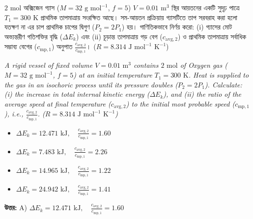 \documentclass[12pt, a4paper]{article}
\begin{document}
\begin{tcolorbox}[questionbox={প্রশ্ন (Question) 24}]
    \noindent
    $2\text{ mol}$ অক্সিজেন গ্যাস ($M = 32\text{ g mol}^{-1}$, $f = 5$) $V = 0.01\text{ m}^3$ স্থির আয়তনের একটি সুদৃঢ় পাত্রে $T_1 = 300\text{ K}$ প্রাথমিক তাপমাত্রায় সংরক্ষিত আছে। সম-আয়তন প্রক্রিয়ায় গ্যাসটিতে তাপ সরবরাহ করা হলো যতক্ষণ না এর চাপ প্রাথমিক চাপের দ্বিগুণ ($P_2 = 2P_1$) হয়। গাণিতিকভাবে নির্ণয় করো: (i) গ্যাসের মোট অভ্যন্তরীণ গতিশক্তির বৃদ্ধি ($\Delta E_k$) এবং (ii) চূড়ান্ত তাপমাত্রায় গড় বেগ ($c_{\text{avg},2}$) ও প্রাথমিক তাপমাত্রায় সর্বাধিক সম্ভাব্য বেগের ($c_{\text{mp},1}$) অনুপাত $\frac{c_{\text{avg},2}}{c_{\text{mp},1}}$। ($R = 8.314\text{ J mol}^{-1}\text{ K}^{-1}$)
    
    \vspace{0.8em}
    \begin{english}
    \noindent\textit{\color{darkgray}
    A rigid vessel of fixed volume $V = 0.01\text{ m}^3$ contains $2\text{ mol}$ of Oxygen gas ($M = 32\text{ g mol}^{-1}$, $f = 5$) at an initial temperature $T_1 = 300\text{ K}$. Heat is supplied to the gas in an isochoric process until its pressure doubles ($P_2 = 2P_1$). Calculate: (i) the increase in total internal kinetic energy ($\Delta E_k$), and (ii) the ratio of the average speed at final temperature ($c_{\text{avg},2}$) to the initial most probable speed ($c_{\text{mp},1}$), i.e., $\frac{c_{\text{avg},2}}{c_{\text{mp},1}}$. ($R = 8.314\text{ J mol}^{-1}\text{ K}^{-1}$)
    }
    \end{english}
\end{tcolorbox}

\begin{itemize}[label={}, leftmargin=1cm, itemsep=0.5em]
    \item[\textbf{A)}] $\Delta E_k = 12.471\text{ kJ}, \quad \frac{c_{\text{avg},2}}{c_{\text{mp},1}} = 1.60$
    \item[\textbf{B)}] $\Delta E_k = 7.483\text{ kJ}, \quad \frac{c_{\text{avg},2}}{c_{\text{mp},1}} = 2.26$
    \item[\textbf{C)}] $\Delta E_k = 14.965\text{ kJ}, \quad \frac{c_{\text{avg},2}}{c_{\text{mp},1}} = 1.22$
    \item[\textbf{D)}] $\Delta E_k = 24.942\text{ kJ}, \quad \frac{c_{\text{avg},2}}{c_{\text{mp},1}} = 1.41$
\end{itemize}

\vspace{0.5em}
\begin{tcolorbox}[answerbox]
    \textbf{\color{success} উত্তর:} A) $\Delta E_k = 12.471\text{ kJ}, \quad \frac{c_{\text{avg},2}}{c_{\text{mp},1}} = 1.60$
\end{tcolorbox}
\vspace{1em}
\end{document}
